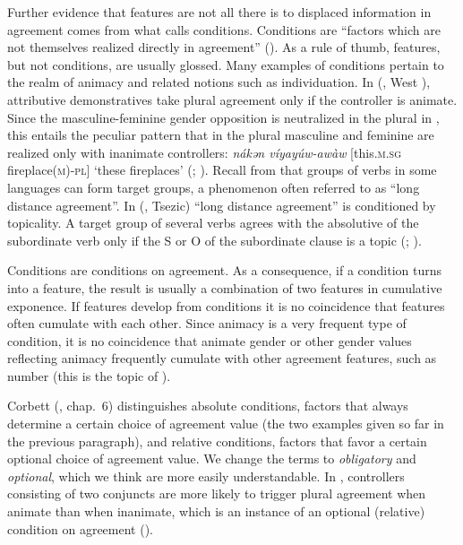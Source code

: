 \documentclass[output=collectionpaper]{langsci/langscibook}
\begin{document}
Further evidence that features are not all there is to displaced information in agreement comes from what \citealt{Corbett2006} calls conditions. Conditions are ``factors which are not themselves realized directly in agreement'' (\citealt[176]{Corbett2006}). As a rule of thumb, features, but not conditions, are usually glossed. Many examples of conditions pertain to the realm of animacy and related notions such as individuation. In  (, West ), attributive demonstratives take plural agreement only if the controller is animate. Since the masculine-feminine gender opposition is neutralized in the plural in , this entails the peculiar pattern that in the plural masculine and feminine are realized only with inanimate controllers: \textit{nákǝn víyayúw-awàw} [this.\textsc{m.sg} fireplace\textsc{(m)-pl}] `these fireplaces' (\citealt[193]{Schuh1998}; \citealt[178]{Corbett2006}). Recall from  that groups of verbs in some  languages can form target groups, a phenomenon often referred to as ``long distance agreement''. In  (, Tsezic) ``long distance agreement'' is conditioned by topicality. A target group of several verbs agrees with the absolutive of the subordinate verb only if the S or O of the subordinate clause is a topic (\citealt{Polinsky1999}; \citealt[197]{Corbett2006}).

Conditions are conditions on agreement. As a consequence, if a condition turns into a feature, the result is usually a combination of two features in cumulative exponence. If features develop from conditions it is no coincidence that features often cumulate with each other. Since animacy is a very frequent type of condition, it is no coincidence that animate gender or other gender values reflecting animacy frequently cumulate with other agreement features, such as number (this is the topic of ).

Corbett (\citealt*{Corbett2006}, chap.~6) distinguishes absolute conditions, factors that always determine a certain choice of agreement value (the two examples given so far in the previous paragraph), and relative conditions, factors that favor a certain optional choice of agreement value. We change the terms to \emph{obligatory} and \emph{optional}, which we think are more easily understandable. In , controllers consisting of two conjuncts are more likely to trigger plural agreement when animate than when inanimate, which is an instance of an optional (relative) condition on agreement (\citealt[179]{Corbett2006}).
\end{document}
